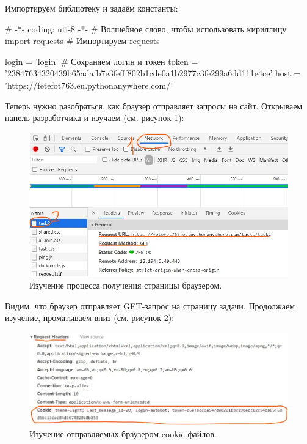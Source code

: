 \documentclass[12pt]{article}
\begin{document}
	Импортируем библиотеку и задаём константы: 
	\begin{pythoncode}
# -*- coding: utf-8 -*-                           # Волшебное слово, чтобы использовать кириллицу
import requests                                   # Импортируем requests 

login = 'login'                                   # Сохраняем логин и токен
token = '23847634320439b65adafb7e3fefff802b1cde0a1b2977c3fe299a6dd111e4ce'
host = 'https://fetefot763.eu.pythonanywhere.com/'
	\end{pythoncode}
	
	Теперь нужно разобраться, как браузер отправляет запросы на сайт. Открываем панель разработчика и изучаем (см. рисунок \ref{fig:browser1}): 
\begin{figure}[H]
	\includegraphics[width=\linewidth]{BrowserNetworkAnalysis0.jpg}
	\caption{Изучение процесса получения страницы браузером.}
 	\label{fig:browser1}
\end{figure}
	
	Видим, что браузер отправляет GET-запрос на страницу задачи. Продолжаем изучение, проматываем вниз (см. рисунок \ref{fig:browser2}):
	
\begin{figure}[H]
	\includegraphics[width=\linewidth]{BrowserNetworkAnalysis2.jpg}
	\caption{Изучение отправляемых браузером cookie-файлов.}
 	\label{fig:browser2}
\end{figure}
	
\end{document}
